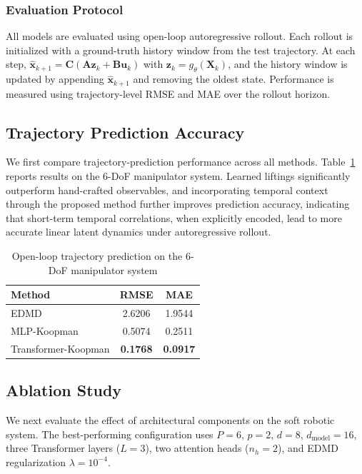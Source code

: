 \documentclass[journal]{IEEEtran}
\newcommand{\vx}{\mathbf{x}}
\newcommand{\vu}{\mathbf{u}}
\newcommand{\vz}{\mathbf{z}}
\newcommand{\mA}{\mathbf{A}}
\newcommand{\mB}{\mathbf{B}}
\newcommand{\mC}{\mathbf{C}}
\newcommand{\mX}{\mathbf{X}}
\begin{document}
\subsubsection{Evaluation Protocol}
\label{sec:eval_protocol}

All models are evaluated using open-loop autoregressive rollout. Each rollout is initialized with a ground-truth history window from the test trajectory. At each step, $\hat{\vx}_{k+1} = \mC(\mA \vz_k + \mB \vu_k)$ with $\vz_k = g_\theta(\mX_k)$, and the history window is updated by appending $\hat{\vx}_{k+1}$ and removing the oldest state. Performance is measured using trajectory-level RMSE and MAE over the rollout horizon.

\subsection{Trajectory Prediction Accuracy}

We first compare trajectory-prediction performance across all methods. Table~\ref{tab:prediction_platform_a} reports results on the 6-DoF manipulator system. Learned liftings significantly outperform hand-crafted observables, and incorporating temporal context through the proposed method further improves prediction accuracy, indicating that short-term temporal correlations, when explicitly encoded, lead to more accurate linear latent dynamics under autoregressive rollout.

\begin{table}[!t]
\renewcommand{\arraystretch}{1.2}
\caption{Open-loop trajectory prediction on the 6-DoF manipulator system}
\label{tab:prediction_platform_a}
\centering
\begin{tabular}{lcc}
\toprule
Method & RMSE & MAE \\
\midrule
EDMD & 2.6206 & 1.9544 \\
MLP-Koopman & 0.5074 & 0.2511 \\
Transformer-Koopman & \textbf{0.1768} & \textbf{0.0917} \\
\bottomrule
\end{tabular}
\end{table}

\subsection{Ablation Study}

We next evaluate the effect of architectural components on the soft robotic system. The best-performing configuration uses $P=6$, $p=2$, $d=8$, $d_{\mathrm{model}}=16$, three Transformer layers ($L=3$), two attention heads ($n_h=2$), and EDMD regularization $\lambda=10^{-4}$.
\end{document}
